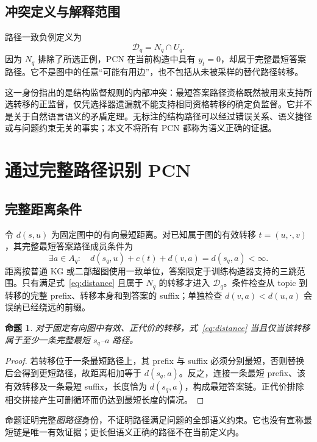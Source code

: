 \documentclass[UTF8,a4paper,10pt,fontset=fandol]{ctexart}
\newtheorem{proposition}{命题}
\newcommand{\pcn}{\mathcal D_q}
\begin{document}
\subsection{冲突定义与解释范围}
路径一致负例定义为
\begin{equation}
\pcn=N_q\cap U_q.
\label{eq:pcn}
\end{equation}
因为 $N_q$ 排除了所选正例，PCN 在当前构造中具有 $y_t=0$，却属于完整最短答案路径。它不是图中的任意“可能有用边”，也不包括从未被采样的替代路径转移。

这一身份指出的是结构监督规则的内部冲突：最短答案路径资格既然被用来支持所选转移的正监督，仅凭选择器遗漏就不能支持相同资格转移的确定负监督。它并不是关于自然语言语义的矛盾定理。无标注的结构路径可以经过错误关系、语义捷径或与问题约束无关的事实；本文不将所有 PCN 都称为语义正确的证据。

\section{通过完整路径识别 PCN}
\subsection{完整距离条件}
令 $d(s,u)$ 为固定图中的有向最短距离。对已知属于图的有效转移 $t=(u,\cdot,v)$，其完整最短答案路径成员条件为
\begin{equation}
\exists a\in A_q:\quad d(s_q,u)+c(t)+d(v,a)=d(s_q,a)<\infty.
\label{eq:distance}
\end{equation}
距离按普通 KG 或二部超图使用一致单位，答案限定于训练构造器支持的三跳范围。只有满足式~\eqref{eq:distance} 且属于 $N_q$ 的转移才进入 $\pcn$。条件检查从 topic 到转移的完整 prefix、转移本身和到答案的 suffix；单独检查 $d(v,a)<d(u,a)$ 会误纳已经绕远的前缀。

\begin{proposition}
对于固定有向图中有效、正代价的转移，式~\eqref{eq:distance} 当且仅当该转移属于至少一条完整最短 $s_q$--$a$ 路径。
\end{proposition}
\begin{proof}
若转移位于一条最短路径上，其 prefix 与 suffix 必须分别最短，否则替换后会得到更短路径，故距离相加等于 $d(s_q,a)$。反之，连接一条最短 prefix、该有效转移及一条最短 suffix，长度恰为 $d(s_q,a)$，构成最短答案链。正代价排除相交拼接产生可删循环而仍达到最短长度的情况。
\end{proof}

命题证明完整\emph{图路径}身份，不证明路径满足问题的全部语义约束。它也没有宣称最短链是唯一有效证据；更长但语义正确的路径不在当前定义内。
\end{document}
